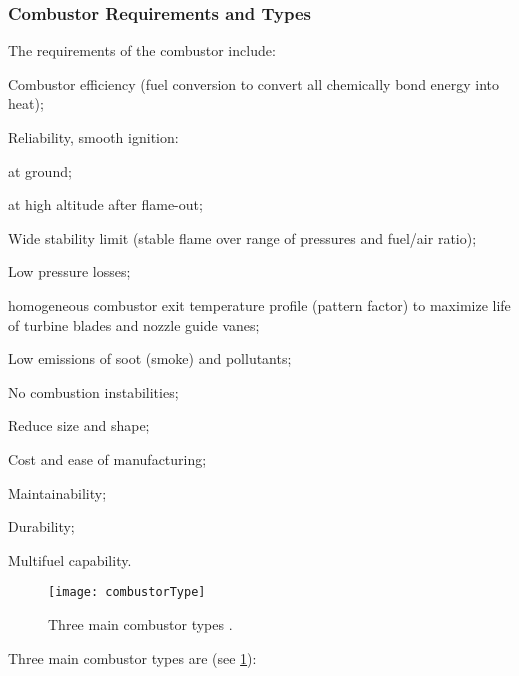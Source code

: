 \subsubsection{Combustor Requirements and Types}
The requirements of the combustor include:
\begin{itemizePacked}
\item Combustor efficiency (fuel conversion to convert all chemically bond energy into heat);
\item Reliability, smooth ignition:
  \begin{itemizePacked}
  \item at ground;
  \item at high altitude after flame-out;
  \end{itemizePacked}
\item Wide stability limit (stable flame over range of pressures and fuel/air ratio);
\item Low pressure losses;
\item homogeneous  combustor exit temperature profile (pattern factor) to maximize life of turbine blades and nozzle guide vanes;
\item Low emissions of soot (smoke) and pollutants;
\item No combustion instabilities;
\item Reduce size and shape;
\item Cost and ease of manufacturing;
\item Maintainability;
\item Durability;
\item Multifuel capability.
\end{itemizePacked}
\begin{figure}[!htb!]
\begin{center}
  \texttt{[image: combustorType]}
  \caption{\label{FIG_COMBUSTOR_TYPE}Three main combustor types \cite{LEFEBVRE_BOOK1999}.}
\end{center}
\end{figure}
Three main combustor types are (see \cref{FIG_COMBUSTOR_TYPE}):

